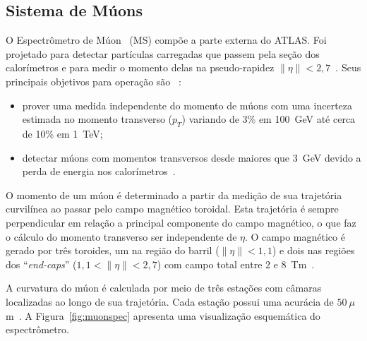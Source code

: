 \subsection{Sistema de Múons}

O Espectrômetro de Múon ~(MS) compõe a parte externa do ATLAS. Foi projetado
para detectar partículas carregadas que passem pela seção dos calorímetros e
para medir o momento delas na pseudo-rapidez $\|\eta\| < 2,7$~\cite{ATLAS2008}.
Seus principais objetivos para operação são ~\cite{Aad:1275998}:

\begin{itemize}
    \item prover uma medida independente do momento de múons com uma incerteza
    estimada no momento transverso ($p_T$) variando de 3\% em 100~GeV até cerca
    de 10\% em 1~TeV; 
    \item detectar múons com momentos transversos desde maiores que 3~GeV
    devido a perda de energia nos calorímetros~\cite{ATLAS2008}.
\end{itemize}

O momento de um  múon é determinado a partir da medição de sua trajetória
curvilínea ao passar pelo campo magnético toroidal. Esta trajetória é sempre
perpendicular em relação a principal componente do campo magnético,  o que faz
o cálculo do momento transverso ser independente de $\eta$. O campo magnético é
gerado por três toroides, um na região do barril ($\|\eta\| < 1,1$) e dois nas
regiões dos ``\emph{end-caps}'' ($1,1 < \|\eta\| < 2,7$) com campo total entre 2
e 8~Tm~\cite{Aad:1275998}.

A curvatura do múon é calculada por meio de três estações com câmaras
localizadas ao longo de sua trajetória. Cada estação possui uma acurácia de
$50~\mu$m~\cite{MUONTDR1997}. A Figura~\ref{fig:muonspec} apresenta uma
visualização esquemática do espectrômetro.



